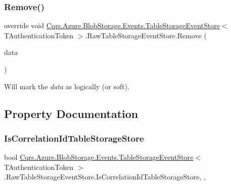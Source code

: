 \subsubsection{\texorpdfstring{Remove()}{Remove()}}
{\footnotesize\ttfamily override void \hyperlink{classCqrs_1_1Azure_1_1BlobStorage_1_1Events_1_1TableStorageEventStore}{Cqrs.\+Azure.\+Blob\+Storage.\+Events.\+Table\+Storage\+Event\+Store}$<$ T\+Authentication\+Token $>$.Raw\+Table\+Storage\+Event\+Store.\+Remove (\begin{DoxyParamCaption}\item[{\hyperlink{classCqrs_1_1Events_1_1EventData}{Event\+Data}}]{data }\end{DoxyParamCaption})}



Will mark the {\itshape data}  as logically (or soft). 



\subsection{Property Documentation}
\mbox{\label{classCqrs_1_1Azure_1_1BlobStorage_1_1Events_1_1TableStorageEventStore_1_1RawTableStorageEventStore_a566f4821980b2ca77f12f88d010beff2}} 
\subsubsection{\texorpdfstring{Is\+Correlation\+Id\+Table\+Storage\+Store}{IsCorrelationIdTableStorageStore}}
{\footnotesize\ttfamily bool \hyperlink{classCqrs_1_1Azure_1_1BlobStorage_1_1Events_1_1TableStorageEventStore}{Cqrs.\+Azure.\+Blob\+Storage.\+Events.\+Table\+Storage\+Event\+Store}$<$ T\+Authentication\+Token $>$.Raw\+Table\+Storage\+Event\+Store.\+Is\+Correlation\+Id\+Table\+Storage\+Store\hspace{0.3cm}{\ttfamily [get]}, {\ttfamily [set]}, {\ttfamily [protected]}}


